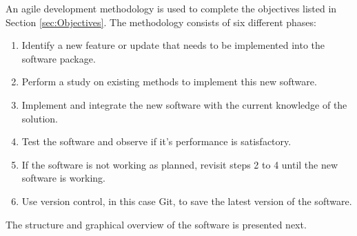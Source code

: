 An agile development methodology is used to complete the objectives listed in Section \ref{sec:Objectives}. The methodology consists of six different phases:
\begin{enumerate}
\item Identify a new feature or update that needs to be implemented into the software package.
\item Perform a study on existing methods to implement this new software.
\item Implement and integrate the new software with the current knowledge of the solution.
\item Test the software and observe if it's performance is satisfactory.
\item If the software is not working as planned, revisit steps 2 to 4 until the new software is working.
\item Use version control, in this case Git, to save the latest version of the software.
\end{enumerate}


The structure and graphical overview of the software is presented next.

